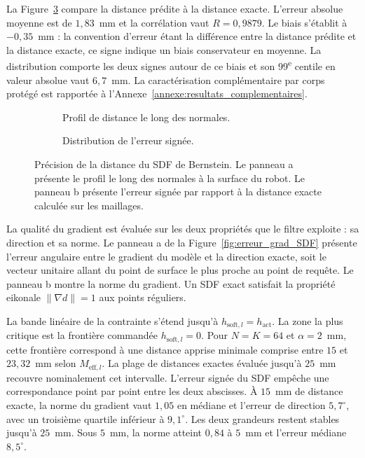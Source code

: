 La Figure~\ref{fig:distance_SDF} compare la distance prédite à la distance exacte. L'erreur absolue moyenne est de $1{,}83$~mm et la corrélation vaut $R = 0{,}9879$. Le biais s'établit à $-0{,}35$~mm : la convention d'erreur étant la différence entre la distance prédite et la distance exacte, ce signe indique un biais conservateur en moyenne. La distribution comporte les deux signes autour de ce biais et son 99\textsuperscript{e} centile en valeur absolue vaut $6{,}7$~mm. La caractérisation complémentaire par corps protégé est rapportée à l'Annexe~\ref{annexe:resultats_complementaires}.

\begin{figure}[!htbp]
    \centering
    \begin{subfigure}[b]{0.48\textwidth}
        \centering
        
        \caption{Profil de distance le long des normales.}\label{fig:distance_profile}
    \end{subfigure}
    \hfill
    \begin{subfigure}[b]{0.48\textwidth}
        \centering
        
        \caption{Distribution de l'erreur signée.}\label{fig:distance_error}
    \end{subfigure}
    \caption[Précision de la distance du SDF de Bernstein]{Précision de la distance du \ac{SDF} de Bernstein. Le panneau a présente le profil le long des normales à la surface du robot. Le panneau b présente l'erreur signée par rapport à la distance exacte calculée sur les maillages.}\label{fig:distance_SDF}
\end{figure}

La qualité du gradient est évaluée sur les deux propriétés que le filtre exploite : sa direction et sa norme. Le panneau a de la Figure~\ref{fig:erreur_grad_SDF} présente l'erreur angulaire entre le gradient du modèle et la direction exacte, soit le vecteur unitaire allant du point de surface le plus proche au point de requête. Le panneau b montre la norme du gradient. Un \ac{SDF} exact satisfait la propriété eikonale $\|\nabla d\| = 1$ aux points réguliers.

La bande linéaire de la contrainte s'étend jusqu'à $h_{\mathrm{soft},l}=h_{\mathrm{act}}$. La zone la plus critique est la frontière commandée $h_{\mathrm{soft},l}=0$. Pour $N=K=64$ et $\alpha=2$~mm, cette frontière correspond à une distance apprise minimale comprise entre $15$ et $23{,}32$~mm selon $M_{\mathrm{eff},l}$. La plage de distances exactes évaluée jusqu'à $25$~mm recouvre nominalement cet intervalle. L'erreur signée du \ac{SDF} empêche une correspondance point par point entre les deux abscisses. À $15$~mm de distance exacte, la norme du gradient vaut $1{,}05$ en médiane et l'erreur de direction $5{,}7^\circ$, avec un troisième quartile inférieur à $9{,}1^\circ$. Les deux grandeurs restent stables jusqu'à $25$~mm. Sous $5$~mm, la norme atteint $0{,}84$ à $5$~mm et l'erreur médiane $8{,}5^\circ$.

